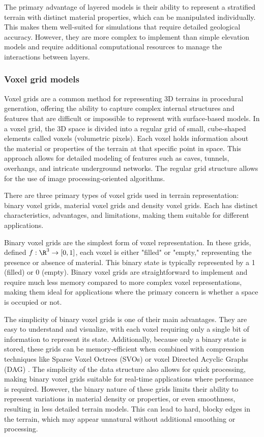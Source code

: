 The primary advantage of layered models is their ability to represent a stratified terrain with distinct material properties, which can be manipulated individually. This makes them well-suited for simulations that require detailed geological accuracy. However, they are more complex to implement than simple elevation models and require additional computational resources to manage the interactions between layers. 


\subsubsection{Voxel grid models}
Voxel grids are a common method for representing 3D terrains in procedural generation, offering the ability to capture complex internal structures and features that are difficult or impossible to represent with surface-based models. In a voxel grid, the 3D space is divided into a regular grid of small, cube-shaped elements called voxels (volumetric pixels). Each voxel holds information about the material or properties of the terrain at that specific point in space. This approach allows for detailed modeling of features such as caves, tunnels, overhangs, and intricate underground networks. The regular grid structure allows for the use of image processing-oriented algorithms.

There are three primary types of voxel grids used in terrain representation: binary voxel grids, material voxel grids and density voxel grids. Each has distinct characteristics, advantages, and limitations, making them suitable for different applications. 

Binary voxel grids are the simplest form of voxel representation. In these grids, defined $f: \R^3 \to [0, 1]$, each voxel is either "filled" or "empty," representing the presence or absence of material. This binary state is typically represented by a 1 (filled) or 0 (empty). Binary voxel grids are straightforward to implement and require much less memory compared to more complex voxel representations, making them ideal for applications where the primary concern is whether a space is occupied or not.

The simplicity of binary voxel grids is one of their main advantages. They are easy to understand and visualize, with each voxel requiring only a single bit of information to represent its state. Additionally, because only a binary state is stored, these grids can be memory-efficient when combined with compression techniques like Sparse Voxel Octrees (SVOs) \cite{Laine2010} or voxel Directed Acyclic Graphs (DAG) \cite{Villanueva2017,Careil2020}. The simplicity of the data structure also allows for quick processing, making binary voxel grids suitable for real-time applications where performance is required. However, the binary nature of these grids limits their ability to represent variations in material density or properties, or even smoothness, resulting in less detailed terrain models. This can lead to hard, blocky edges in the terrain, which may appear unnatural without additional smoothing or processing.

